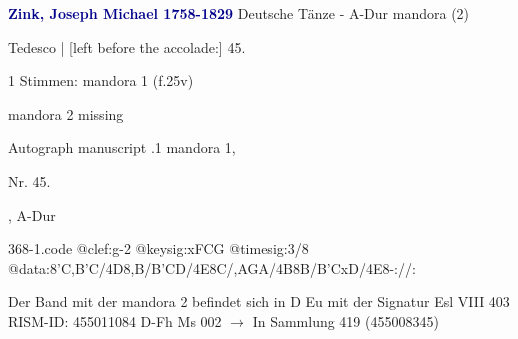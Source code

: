 \documentclass[twocolumn]{book}
\begin{document}
\newline \par \vspace{7pt} \textcolor{darkblue}{\textbf{Zink, Joseph Michael  1758-1829}}
\newline Deutsche Tänze - A-Dur
\newline mandora (2)
\newline \begin{itshape}[f.25v, at left:] Tedesco | [left before the accolade:] 45.\end{itshape} 
\newline \textcolor{darkblue}{}  1 Stimmen: mandora 1  (f.25v)
\newline \begin{small} mandora 2 missing\end{small} 
\newline Autograph manuscript
.1  mandora 1, \begin{itshape}Nr. 45.\end{itshape}, A-Dur  
\begin{filecontents*}{368-1.code}
@clef:g-2
@keysig:xFCG
@timesig:3/8
@data:8'C,B'C/4D8,B/B'CD/4E8C/,A{GA}/4B8B/B'CxD/4E8-://:
\end{filecontents*}
\newline
%
\newline Der Band mit der mandora 2 befindet sich in D Eu mit der Signatur Esl VIII 403
\newline RISM-ID: 455011084
\newline D-Fh  Ms 002
\newline $\rightarrow$ In Sammlung 419 (455008345)
      
\end{document}
